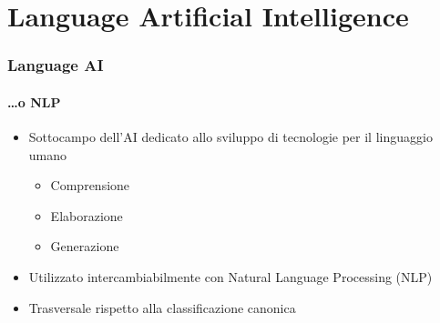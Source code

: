 \section{Language Artificial Intelligence} %
\label{sec:language_ai}
%
\begin{frame}[t,fragile] \frametitle{Language AI}
    \framesubtitle{\ldots o NLP}
	{\small
	    \begin{minipage}[t]{\textwidth}
	    	\begin{itemize}[leftmargin=10pt,align=right]
				\onslide<1->\item[\alert{\faArrowCircleRight}] Sottocampo dell'AI dedicato allo sviluppo di tecnologie per il linguaggio umano
				\begin{itemize}[leftmargin=10pt,align=right]
					\item[\alert{\faArrowCircleRight}] Comprensione
					\item[\alert{\faArrowCircleRight}] Elaborazione
					\item[\alert{\faArrowCircleRight}] Generazione
				\end{itemize}
				\item[\alert{\faArrowCircleRight}] Utilizzato intercambiabilmente con \alert{Natural Language Processing} (NLP)
				\onslide<3->\item[\alert{\faExclamationTriangle}] \alert{Trasversale} rispetto alla classificazione canonica
			\end{itemize}
	    \end{minipage}
	}
\end{frame}
%
